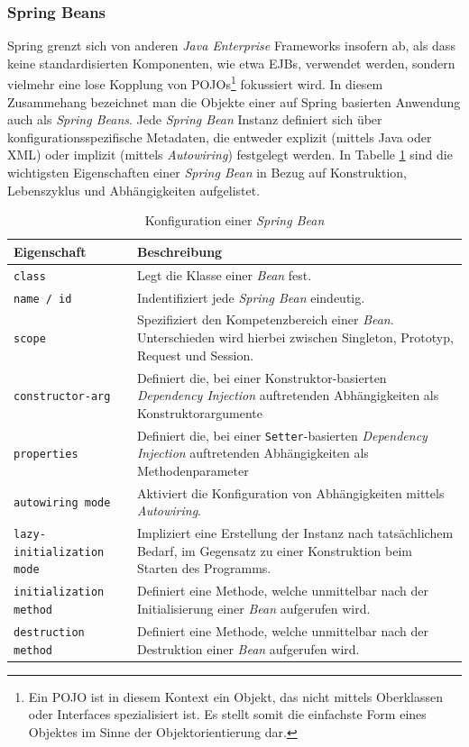 \subsubsection*{Spring Beans}
Spring grenzt sich von anderen \textit{Java Enterprise} Frameworks insofern ab, als dass keine standardisierten Komponenten, wie etwa \acs{EJBs}, verwendet werden, sondern vielmehr eine lose Kopplung von \acs{POJO}s\footnote{Ein \ac{POJO} ist in diesem Kontext ein Objekt, das nicht mittels Oberklassen oder Interfaces spezialisiert ist. Es stellt somit die einfachste Form eines Objektes im Sinne der Objektorientierung dar.} fokussiert wird. In diesem Zusammehang bezeichnet man die Objekte einer auf Spring basierten Anwendung auch als \textit{Spring Beans}. Jede \textit{Spring Bean} Instanz definiert sich über konfigurationsspezifische Metadaten, die entweder explizit (mittels Java oder XML) oder implizit (mittels \textit{Autowiring}) festgelegt werden. In Tabelle \ref{tab:spring_config} sind die wichtigsten Eigenschaften einer \textit{Spring Bean} in Bezug auf Konstruktion, Lebenszyklus und Abhängigkeiten aufgelistet. 

\begin{table}[!ht]
\caption[Konfiguration einer \textit{Spring Bean}, in Anlehnung an \cite{tuto:beans}]{Konfiguration einer \textit{Spring Bean} \cite{tuto:beans}}
\label{tab:spring_config} 
  \begin{tabular}{p{4.8cm}p{9.4cm}}
    \toprule 
    \textbf{Eigenschaft} & \textbf{Beschreibung}  \\
    \hline 
    \texttt{class} & Legt die Klasse einer \textit{Bean} fest. \\
    \texttt{name / id} & Indentifiziert jede \textit{Spring Bean} eindeutig. \\
    \texttt{scope} & Spezifiziert den Kompetenzbereich einer \textit{Bean}. Unterschieden wird hierbei zwischen Singleton, Prototyp, Request und Session. \\
     \texttt{constructor-arg} & Definiert die, bei einer Konstruktor-basierten \textit{Dependency Injection} auftretenden Abhängigkeiten als Konstruktorargumente \\
      \texttt{properties} & Definiert die, bei einer \texttt{Setter}-basierten \textit{Dependency Injection} auftretenden Abhängigkeiten als Methodenparameter \\
      \texttt{autowiring mode} & Aktiviert die Konfiguration von Abhängigkeiten mittels \textit{Autowiring}. \\
      \texttt{lazy-initialization mode} & Impliziert eine Erstellung der Instanz nach tatsächlichem Bedarf, im Gegensatz zu einer Konstruktion beim Starten des Programms. \\
      \texttt{initialization method} & Definiert eine Methode, welche unmittelbar nach der Initialisierung einer \textit{Bean} aufgerufen wird. \\
      \texttt{destruction method} & Definiert eine Methode, welche unmittelbar nach der Destruktion einer \textit{Bean} aufgerufen wird. \\
   	\bottomrule
  \end{tabular}
\end{table}

